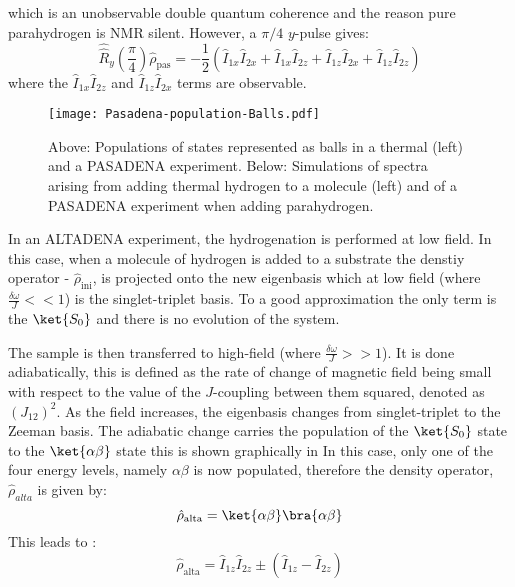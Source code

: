  which is an unobservable double quantum coherence and the reason pure parahydrogen is NMR silent. However,
 a $\pi/4$ $y$-pulse gives:
 \begin{equation}
 \hat{\hat{R}}_y(\frac{\pi}{4})\hat{\rho}_{\text{pas}} = -\frac{1}{2}(\hat{I}_{1x}\hat{I}_{2x} + \hat{I}_{1x}\hat{I}_{2z} + \hat{I}_{1z}\hat{I}_{2x} + \hat{I}_{1z}\hat{I}_{2z})
 \end{equation}
where the $\hat{I}_{1x}\hat{I}_{2z}$ and $\hat{I}_{1z}\hat{I}_{2x}$ terms are observable.
 \begin{figure*}
   \begin{center}
   \texttt{[image: Pasadena-population-Balls.pdf]}
   \end{center}
   \caption{Above: Populations of states represented as balls in a thermal (left) and a PASADENA experiment. Below: Simulations
   of spectra arising from adding thermal hydrogen to a molecule (left) and of a PASADENA experiment when adding parahydrogen.}
   \label{fig:PASADENA}
 \end{figure*}

 In an ALTADENA experiment, the hydrogenation is performed at low field. In this case, when a molecule of hydrogen
 is added to a substrate the denstiy operator - $\hat{\rho}_\text{ini}$, is projected onto the new eigenbasis which
 at low field (where $\frac{\delta{\omega}}{J}<<1$) is the singlet-triplet basis. To a good approximation the only term
 is the $\ket{S_0}$ and there is no evolution of the system.

 The sample is then transferred to high-field (where $\frac{\delta{\omega}}{J}>>1$). It is done adiabatically, this is defined as the rate
 of change of magnetic field being small with respect to the value of the $J$-coupling between them squared, denoted as $(J_{12})^2$. As
 the field increases, the eigenbasis changes from singlet-triplet to the Zeeman basis. The adiabatic change carries the population of the
 $\ket{S_0}$ state to the $\ket{\alpha\beta}$ state this is shown graphically in  In this case, only one of the
 four energy levels, namely $\alpha\beta$ is now populated, therefore the density operator, $\hat{\rho}_{alta}$ is given by:
 \begin{equation}
   \hat{\rho}_{\text{alta}} = \ket{\alpha\beta}\bra{\alpha\beta}
 \end{equation}
  This leads to \citep{RN128}:
 \begin{equation}
   \hat{\rho}_{\text{alta}} = \hat{I}_{1z}\hat{I}_{2z}±(\hat{I}_{1z}-\hat{I}_{2z})
 \end{equation}

